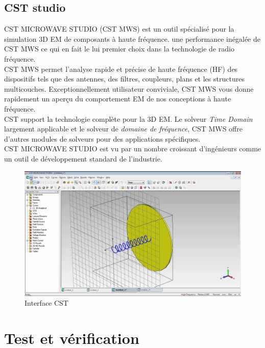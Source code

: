 \documentclass[11pt, a4paper, twoside]{book}
\begin{document}
\subsection{CST studio}
CST MICROWAVE STUDIO (CST MWS) est un outil spécialisé pour la simulation 3D EM de composants à haute fréquence. une performance inégalée de CST MWS  ce qui en fait le lui premier choix dans la technologie de radio fréquence.\\

CST MWS permet l'analyse rapide et précise de haute fréquence (HF) des dispositifs tels que des antennes, des filtres, coupleurs, plans et les structures multicouches. Exceptionnellement utilisateur conviviale, CST MWS vous donne rapidement un aperçu du comportement EM de nos conceptions à haute fréquence.\\

CST support la technologie complète pour la 3D EM. Le solveur \emph{Time Domain} largement applicable et le solveur de \emph{domaine de fréquence}, CST MWS offre d'autres modules de solveurs pour des applications spécifiques. \\

CST MICROWAVE STUDIO est vu par un nombre croissant d'ingénieurs comme un outil de développement standard de l'industrie.
\begin{figure}[H]
\centering
\includegraphics[width=\textwidth]{cst}
\caption{Interface CST}
\end{figure}

\section{Test	 et vérification	}
\end{document}
